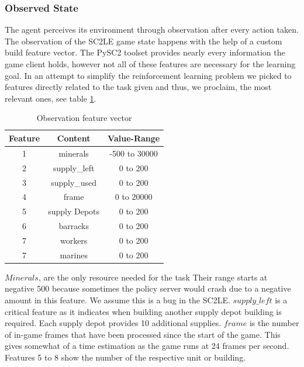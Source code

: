 \documentclass[12pt,a4paper]{article}
\begin{document}
\subsubsection{Observed State}
The agent perceives its environment through observation after every action taken. The observation of the SC2LE game state happens with the help of a custom build feature vector. The PySC2 toolset provides nearly every information the game client holds, however not all of these features are necessary for the learning goal. In an attempt to simplify the reinforcement learning problem we picked to features directly related to the task given and thus, we proclaim, the most relevant ones, see table \ref{tab:observation}.
\begin{table}
    \begin{center}
        \begin{tabular}{ | c | c || c | }
            \hline
            {\bf Feature} & {\bf Content} & {\bf Value-Range} \\
            \hline
            1 & minerals & -500 to 30000\\ 
            \hline
            2 & supply\_left & 0 to 200 \\  
            \hline
            3 & supply\_used & 0 to 200 \\
            \hline
            4 & frame & 0 to 20000 \\
            \hline
            5 & supply Depots & 0 to 200 \\
            \hline
            6 & barracks & 0 to 200 \\
            \hline
            7 & workers & 0 to 200 \\
            \hline
            7 & marines & 0 to 200 \\
            \hline
        \end{tabular}
    \end{center}
    \caption{Observation feature vector}
    \label{tab:observation}
\end{table}

$Minerals$, are the only resource needed for the task Their range starts at negative 500 because sometimes the policy server would crash due to a negative amount in this feature. We assume this is a bug in the SC2LE. $supply\_left$ is a critical feature as it indicates when building another supply depot building is required. Each supply depot provides 10 additional supplies. $frame$ is the number of in-game frames that have been processed since the start of the game. This gives somewhat of a time estimation as the game runs at 24 frames per second. Features 5 to 8 show the number of the respective unit or building.
\end{document}
